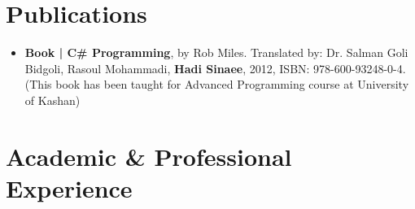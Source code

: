 \documentclass[10pt,a4paper,roman]{moderncv}        %
\begin{document}

\section{Publications}
\begin{itemize} \itemsep \mediumSpace

\item{
\textbf{Book | C\# Programming}, by Rob Miles. Translated by: Dr. Salman Goli Bidgoli, Rasoul Mohammadi, \textbf{Hadi Sinaee}, 2012, ISBN: 978-600-93248-0-4. (This book has been taught for Advanced Programming course at University of Kashan)
}

\end{itemize}


\section{Academic \& Professional Experience}

\vspace{6pt}
\end{document}
